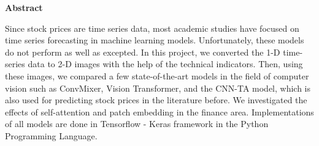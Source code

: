 \documentclass[]{article}
\begin{document}
\tableofcontents

\maketitle
\begin{center}
    \textbf{\Large Abstract}
\end{center}
Since stock prices are time series data, most academic studies have focused on time series forecasting in machine learning models. Unfortunately, these models do not perform as well as excepted. In this project, we converted the 1-D time-series data to 2-D images with the help of the technical indicators. Then, using these images, we compared a few state-of-the-art models in the field of computer vision such as ConvMixer, Vision Transformer, and the CNN-TA model, which is also used for predicting stock prices in the literature before. We investigated the effects of self-attention and patch embedding in the finance area. Implementations of all models are done in Tensorflow - Keras framework in the Python Programming Language.
\end{document}
